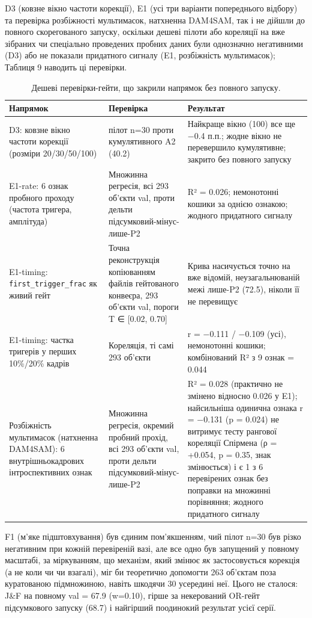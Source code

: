 \documentclass[11pt]{article}
\begin{document}
D3 (ковзне вікно частоти корекції), E1 (усі три варіанти попереднього відбору) та перевірка розбіжності мультимасок, натхненна DAM4SAM, так і не дійшли до повного скорегованого запуску, оскільки дешеві пілоти або кореляції на вже зібраних чи спеціально проведених пробних даних були однозначно негативними (D3) або не показали придатного сигналу (E1, розбіжність мультимасок); Таблиця 9 наводить ці перевірки.

\begin{table}[!htbp]
\centering
\footnotesize
\caption{Дешеві перевірки-гейти, що закрили напрямок без повного запуску.}
\label{tab:9}
\small
\begin{tabularx}{\textwidth}{@{}LLL@{}}
\toprule
Напрямок & Перевірка & Результат \\
\midrule
D3: ковзне вікно частоти корекції (розміри 20/30/50/100) & пілот n=30 проти кумулятивного A2 (40.2) & Найкраще вікно (100) все ще −0.4 п.п.; жодне вікно не перевершило кумулятивне; закрито без повного запуску \\
E1-rate: 6 ознак пробного проходу (частота тригера, амплітуда) & Множинна регресія, всі 293 об'єкти val, проти дельти підсумковий-мінус-лише-P2 & R² = 0.026; немонотонні кошики за однією ознакою; жодного придатного сигналу \\
E1-timing: \texttt{first\_trigger\_frac} як живий гейт & Точна реконструкція копіюванням файлів гейтованого конвеєра, 293 об'єкти val, пороги T ∈ [0.02, 0.70] & Крива насичується точно на вже відомій, неузагальнюваній межі лише-P2 (72.5), ніколи її не перевищує \\
E1-timing: частка тригерів у перших 10\%/20\% кадрів & Кореляція, ті самі 293 об'єкти & r = −0.111 / −0.109 (усі), немонотонні кошики; комбінований R² з 9 ознак = 0.044 \\
Розбіжність мультимасок (натхненна DAM4SAM): 6 внутрішньокадрових інтроспективних ознак & Множинна регресія, окремий пробний прохід, всі 293 об'єкти val, проти дельти підсумковий-мінус-лише-P2 & R² = 0.028 (практично не змінено відносно 0.026 у E1); найсильніша одинична ознака r = −0.131 (p = 0.024) не витримує тесту рангової кореляції Спірмена (ρ = +0.054, p = 0.35, знак змінюється) і є 1 з 6 перевірених ознак без поправки на множинні порівняння; жодного придатного сигналу \\
\bottomrule
\end{tabularx}
\end{table}

F1 (м'яке підштовхування) був єдиним пом'якшенням, чий пілот n=30 був різко негативним при кожній перевіреній вазі, але все одно був запущений у повному масштабі, за міркуванням, що механізм, який змінює \emph{як} застосовується корекція (а не коли чи чи взагалі), міг би теоретично допомогти 263 об'єктам поза куратованою підмножиною, навіть шкодячи 30 усередині неї. Цього не сталося: J\&F на повному val = 67.9 (w=0.10), гірше за некерований OR-гейт підсумкового запуску (68.7) і найгірший поодинокий результат усієї серії.
\end{document}
